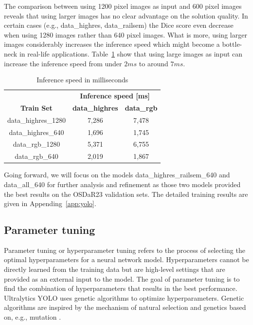 \documentclass[Master,MDS,english]{BASE/twbook} %
\begin{document}
The comparison between using 1200 pixel images as input and 600 pixel images reveals that using larger images has no clear advantage on the solution quality. In certain cases (e.g., data\_highres, data\_railsem) the Dice score even decrease when using 1280 images rather than 640 pixel images. What is more, using larger images considerably increases the inference speed which might become a bottle-neck in real-life applications. Table~\ref{tab:inference_speed} show that using large images as input can increase the inference speed from under $2 ms$ to around $7 ms$. 

\begin{table}[htbp]
    \centering
    \footnotesize
    \begin{tabular}{|c|cc|}
        \hline
		 & \multicolumn{2}{|c|}{\textbf{Inference speed [ms]}} \\
        \textbf{Train Set} & \textbf{data\_highres} & \textbf{data\_rgb} \\
        \hline
        data\_highres\_1280 & 7,286 & 7,478 \\
        data\_highres\_640 & 1,696 & 1,745 \\
        data\_rgb\_1280 & 5,371 & 6,755 \\
        data\_rgb\_640 & 2,019 & 1,867 \\
        \hline
    \end{tabular}
        \caption{Inference speed in milliseconds}
    \label{tab:inference_speed}
\end{table}

Going forward, we will focus on the models data\_highres\_railsem\_640 and data\_all\_640 for further analysis and refinement as those two models provided the best results on the OSDaR23 validation sets. The detailed training results are given in Appending~\ref{app:yolo}.


\subsection{Parameter tuning}

Parameter tuning or hyperparameter tuning refers to the process of selecting the optimal hyperparameters for a neural network model. Hyperparameters cannot be directly learned from the training data but are high-level settings that are provided as an external input to the model. The goal of parameter tuning is to find the combination of hyperparameters that results in the best performance.  Ultralytics YOLO uses genetic algorithms to optimize hyperparameters. Genetic algorithms are inspired by the mechanism of natural selection and genetics based on, e.g., mutation \citep{yolo_parameter}. 
\end{document}
